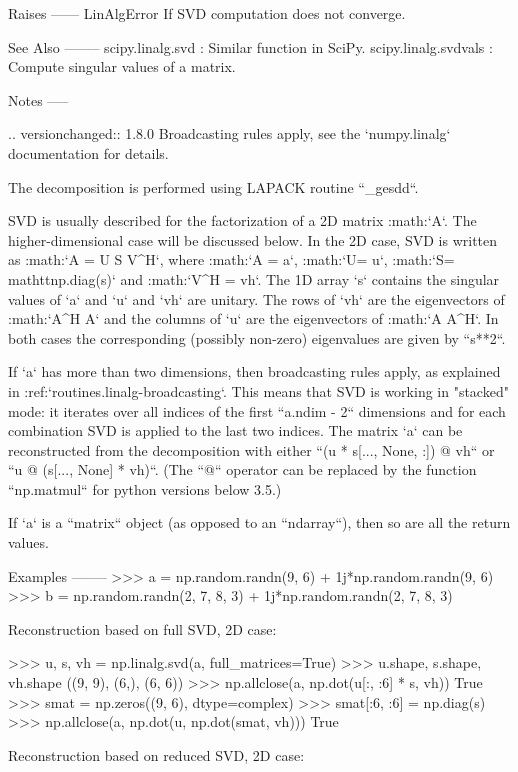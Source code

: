 \begin{DoxyVerb}
Raises
------
LinAlgError
    If SVD computation does not converge.

See Also
--------
scipy.linalg.svd : Similar function in SciPy.
scipy.linalg.svdvals : Compute singular values of a matrix.

Notes
-----

.. versionchanged:: 1.8.0
   Broadcasting rules apply, see the `numpy.linalg` documentation for
   details.

The decomposition is performed using LAPACK routine ``_gesdd``.

SVD is usually described for the factorization of a 2D matrix :math:`A`.
The higher-dimensional case will be discussed below. In the 2D case, SVD is
written as :math:`A = U S V^H`, where :math:`A = a`, :math:`U= u`,
:math:`S= \\mathtt{np.diag}(s)` and :math:`V^H = vh`. The 1D array `s`
contains the singular values of `a` and `u` and `vh` are unitary. The rows
of `vh` are the eigenvectors of :math:`A^H A` and the columns of `u` are
the eigenvectors of :math:`A A^H`. In both cases the corresponding
(possibly non-zero) eigenvalues are given by ``s**2``.

If `a` has more than two dimensions, then broadcasting rules apply, as
explained in :ref:`routines.linalg-broadcasting`. This means that SVD is
working in "stacked" mode: it iterates over all indices of the first
``a.ndim - 2`` dimensions and for each combination SVD is applied to the
last two indices. The matrix `a` can be reconstructed from the
decomposition with either ``(u * s[..., None, :]) @ vh`` or
``u @ (s[..., None] * vh)``. (The ``@`` operator can be replaced by the
function ``np.matmul`` for python versions below 3.5.)

If `a` is a ``matrix`` object (as opposed to an ``ndarray``), then so are
all the return values.

Examples
--------
>>> a = np.random.randn(9, 6) + 1j*np.random.randn(9, 6)
>>> b = np.random.randn(2, 7, 8, 3) + 1j*np.random.randn(2, 7, 8, 3)

Reconstruction based on full SVD, 2D case:

>>> u, s, vh = np.linalg.svd(a, full_matrices=True)
>>> u.shape, s.shape, vh.shape
((9, 9), (6,), (6, 6))
>>> np.allclose(a, np.dot(u[:, :6] * s, vh))
True
>>> smat = np.zeros((9, 6), dtype=complex)
>>> smat[:6, :6] = np.diag(s)
>>> np.allclose(a, np.dot(u, np.dot(smat, vh)))
True

Reconstruction based on reduced SVD, 2D case:


\end{DoxyVerb}
